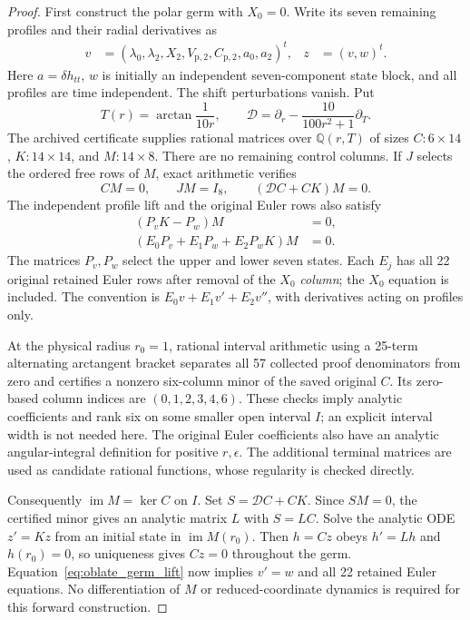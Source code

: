 \begin{proof}
First construct the polar germ with $X_0=0$. Write its seven remaining profiles and their radial derivatives as
\begin{align}
 v&=(\lambda_0,\lambda_2,X_2,V_{\mathrm p,2},C_{\mathrm p,2},a_0,a_2)^t,
 & z&=(v,w)^t.
\end{align}
Here $a=\delta h_{tt}$, $w$ is initially an independent seven-component state block, and all profiles are time independent. The shift perturbations vanish. Put
\begin{equation}
 T(r)=\arctan\frac1{10r},\qquad
 \mathcal D=\partial_r-\frac{10}{100r^2+1}\partial_T.
\end{equation}
The archived certificate supplies rational matrices over $\mathbb Q(r,T)$ of sizes $C:6\times14$, $K:14\times14$, and $M:14\times8$. There are no remaining control columns. If $J$ selects the ordered free rows of $M$, exact arithmetic verifies
\begin{equation}\label{eq:oblate_germ_invariance}
 CM=0,\qquad JM=I_8,\qquad (\mathcal DC+CK)M=0.
\end{equation}
The independent profile lift and the original Euler rows also satisfy
\begin{align}\label{eq:oblate_germ_lift}
 (P_vK-P_w)M&=0,\nonumber\\
 (E_0P_v+E_1P_w+E_2P_wK)M&=0.
\end{align}
The matrices $P_v,P_w$ select the upper and lower seven states. Each $E_j$ has all 22 original retained Euler rows after removal of the $X_0$ \emph{column}; the $X_0$ equation is included. The convention is $E_0v+E_1v'+E_2v''$, with derivatives acting on profiles only.

At the physical radius $r_0=1$, rational interval arithmetic using a 25-term alternating arctangent bracket separates all 57 collected proof denominators from zero and certifies a nonzero six-column minor of the saved original $C$. Its zero-based column indices are $(0,1,2,3,4,6)$. These checks imply analytic coefficients and rank six on some smaller open interval $I$; an explicit interval width is not needed here. The original Euler coefficients also have an analytic angular-integral definition for positive $r,\epsilon$. The additional terminal matrices are used as candidate rational functions, whose regularity is checked directly.

Consequently $\operatorname{im}M=\ker C$ on $I$. Set $S=\mathcal DC+CK$. Since $SM=0$, the certified minor gives an analytic matrix $L$ with $S=LC$. Solve the analytic ODE $z'=Kz$ from an initial state in $\operatorname{im}M(r_0)$. Then $h=Cz$ obeys $h'=Lh$ and $h(r_0)=0$, so uniqueness gives $Cz=0$ throughout the germ. Equation~\eqref{eq:oblate_germ_lift} now implies $v'=w$ and all 22 retained Euler equations. No differentiation of $M$ or reduced-coordinate dynamics is required for this forward construction.


\end{proof}
